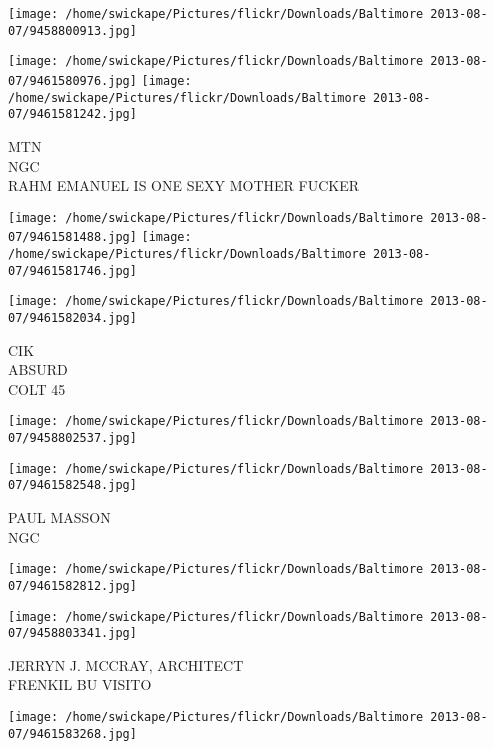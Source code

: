 \documentclass[10pt,letterpaper]{article}
\begin{document}
\texttt{[image: /home/swickape/Pictures/flickr/Downloads/Baltimore 2013-08-07/9458800913.jpg]}

\vspace{0.25in}
\texttt{[image: /home/swickape/Pictures/flickr/Downloads/Baltimore 2013-08-07/9461580976.jpg]}
\texttt{[image: /home/swickape/Pictures/flickr/Downloads/Baltimore 2013-08-07/9461581242.jpg]}

MTN\\
NGC\\
RAHM EMANUEL IS ONE SEXY MOTHER FUCKER\\
\pagebreak

\texttt{[image: /home/swickape/Pictures/flickr/Downloads/Baltimore 2013-08-07/9461581488.jpg]}
\texttt{[image: /home/swickape/Pictures/flickr/Downloads/Baltimore 2013-08-07/9461581746.jpg]}

\vspace{0.25in}
\texttt{[image: /home/swickape/Pictures/flickr/Downloads/Baltimore 2013-08-07/9461582034.jpg]}

CIK\\
ABSURD\\
COLT 45\\
\pagebreak

\texttt{[image: /home/swickape/Pictures/flickr/Downloads/Baltimore 2013-08-07/9458802537.jpg]}

\vspace{0.25in}
\texttt{[image: /home/swickape/Pictures/flickr/Downloads/Baltimore 2013-08-07/9461582548.jpg]}

PAUL MASSON\\
NGC\\
\pagebreak

\texttt{[image: /home/swickape/Pictures/flickr/Downloads/Baltimore 2013-08-07/9461582812.jpg]}

\vspace{0.25in}
\texttt{[image: /home/swickape/Pictures/flickr/Downloads/Baltimore 2013-08-07/9458803341.jpg]}

JERRYN J. MCCRAY, ARCHITECT\\
FRENKIL BU VISITO\\
\pagebreak

\texttt{[image: /home/swickape/Pictures/flickr/Downloads/Baltimore 2013-08-07/9461583268.jpg]}
\end{document}
